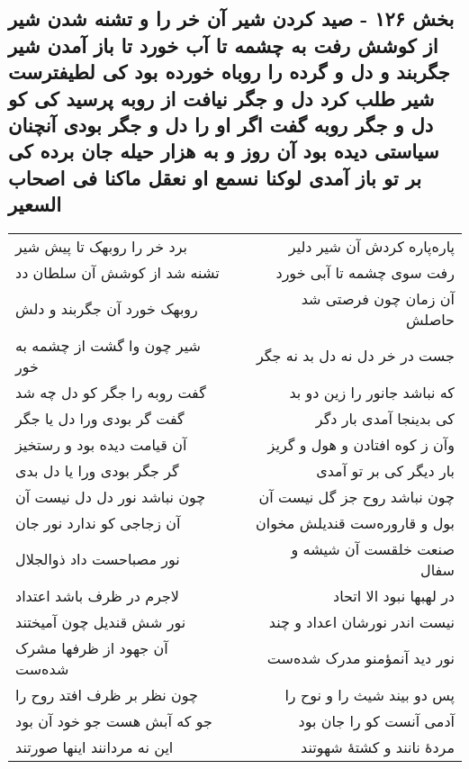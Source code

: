 \begin{center}
\section*{بخش ۱۲۶ - صید کردن شیر آن خر را و تشنه  شدن شیر از کوشش رفت به چشمه تا آب خورد تا باز آمدن شیر جگربند و دل و گرده را روباه خورده بود کی لطیفترست شیر طلب کرد دل و جگر نیافت از روبه پرسید کی کو دل و جگر روبه گفت اگر او  را دل و جگر بودی آنچنان  سیاستی دیده بود آن روز و به هزار حیله جان برده کی بر تو باز آمدی لوکنا نسمع او نعقل ماکنا فی اصحاب السعیر}
\label{sec:sh126}
\begin{longtable}{l p{0.5cm} r}
برد خر را روبهک تا پیش شیر
&&
پاره‌پاره کردش آن شیر دلیر
\\
تشنه شد از کوشش آن سلطان دد
&&
رفت سوی چشمه تا آبی خورد
\\
روبهک خورد آن جگربند و دلش
&&
آن زمان چون فرصتی شد حاصلش
\\
شیر چون وا گشت از چشمه به خور
&&
جست در خر دل نه دل بد نه جگر
\\
گفت روبه را جگر کو دل چه شد
&&
که نباشد جانور را زین دو بد
\\
گفت گر بودی ورا دل یا جگر
&&
کی بدینجا آمدی بار دگر
\\
آن قیامت دیده بود و رستخیز
&&
وآن ز کوه افتادن و هول و گریز
\\
گر جگر بودی ورا یا دل بدی
&&
بار دیگر کی بر تو آمدی
\\
چون نباشد نور دل دل نیست آن
&&
چون نباشد روح جز گل نیست آن
\\
آن زجاجی کو ندارد نور جان
&&
بول و قاروره‌ست قندیلش مخوان
\\
نور مصباحست داد ذوالجلال
&&
صنعت خلقست آن شیشه و سفال
\\
لاجرم در ظرف باشد اعتداد
&&
در لهبها نبود الا اتحاد
\\
نور شش قندیل چون آمیختند
&&
نیست اندر نورشان اعداد و چند
\\
آن جهود از ظرفها مشرک شده‌ست
&&
نور دید آنمؤمنو مدرک شده‌ست
\\
چون نظر بر ظرف افتد روح را
&&
پس دو بیند شیث را و نوح را
\\
جو که آبش هست جو خود آن بود
&&
آدمی آنست کو را جان بود
\\
این نه مردانند اینها صورتند
&&
مردهٔ نانند و کشتهٔ شهوتند
\\
\end{longtable}
\end{center}
